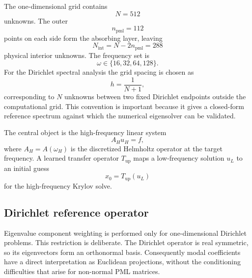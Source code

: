 The one-dimensional grid contains
\[
    N = 512
\]
unknowns. The outer
\[
    n_{\mathrm{pml}} = 112
\]
points on each side form the absorbing layer, leaving
\[
    N_{\mathrm{int}} = N - 2 n_{\mathrm{pml}} = 288
\]
physical interior unknowns. The frequency set is
\[
    \omega \in \{16,32,64,128\}.
\]
For the Dirichlet spectral analysis the grid spacing is chosen as
\[
    h = \frac{1}{N+1},
\]
corresponding to $N$ unknowns between two fixed Dirichlet endpoints outside
the computational grid. This convention is important because it gives a
closed-form reference spectrum against which the numerical eigensolver can be
validated.

The central object is the high-frequency linear system
\begin{equation}
    A_H u_H = f,
    \label{eq:oned_high_frequency_system}
\end{equation}
where $A_H = A(\omega_H)$ is the discretized Helmholtz operator at the target
frequency. A learned transfer operator $T_{\mathrm{up}}$ maps a low-frequency
solution $u_L$ to an initial guess
\begin{equation}
    x_0 = T_{\mathrm{up}}(u_L)
    \label{eq:oned_warm_start}
\end{equation}
for the high-frequency Krylov solve.


\subsection{Dirichlet reference operator}
\label{subsec:methodology_1d_dirichlet}

Eigenvalue component weighting is performed only for one-dimensional
Dirichlet problems. This restriction is deliberate. The Dirichlet operator is
real symmetric, so its eigenvectors form an orthonormal basis. Consequently
modal coefficients have a direct interpretation as Euclidean projections,
without the conditioning difficulties that arise for non-normal PML matrices.

